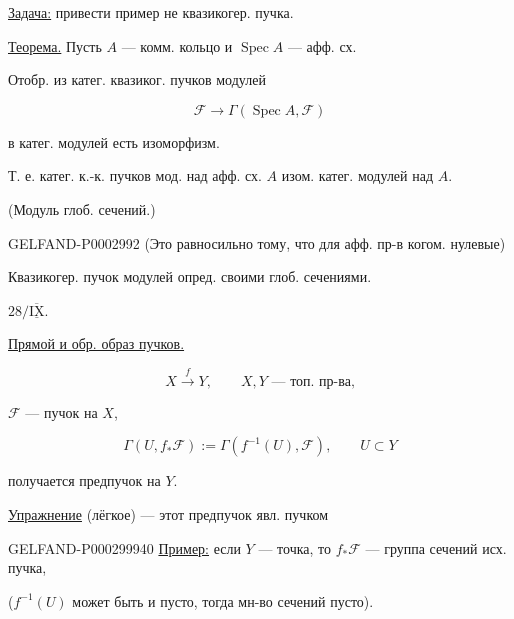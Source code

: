 \underline{Задача:} привести пример не квазикогер. пучка.

\underline{Теорема.} Пусть $A$ --- комм. кольцо и $\operatorname{Spec}A$ --- афф. сх.

Отобр. из катег. квазиког. пучков модулей

\begin{equation*}\mathcal F\longrightarrow\Gamma(\operatorname{Spec}A,\mathcal F)\end{equation*}

в катег. модулей есть изоморфизм.

Т. е. катег. к.-к. пучков мод. над афф. сх. $A$ изом.
катег. модулей над $A$.

(Модуль глоб. сечений.)

\begin{GelfandAdjacentEvidence}{GELFAND-P000299}{2}
(Это равносильно тому, что для афф. пр-в когом. нулевые)

\end{GelfandAdjacentEvidence}


Квазикогер. пучок модулей опред. своими глоб. сечениями.

$28/\overline{\underline{\mathrm{IX}}}$.

\underline{Прямой и обр. образ пучков.}

\begin{equation*}X\overset f{\longrightarrow}Y,\qquad X,Y\text{ --- топ. пр-ва,}\end{equation*}

$\mathcal F$ --- пучок на $X$,

\begin{equation*}\Gamma(U,f_*\mathcal F):=\Gamma(f^{-1}(U),\mathcal F),\qquad U\subset Y\end{equation*}

получается предпучок на $Y$.

\underline{Упражнение} (лёгкое) --- этот предпучок явл. пучком

\begin{GelfandAdjacentEvidence}{GELFAND-P000299}{940}
\underline{Пример:} если $Y$ --- точка, то $f_*\mathcal F$ --- группа сечений исх. пучка,

($f^{-1}(U)$ может быть и пусто, тогда мн-во сечений пусто).

\end{GelfandAdjacentEvidence}



